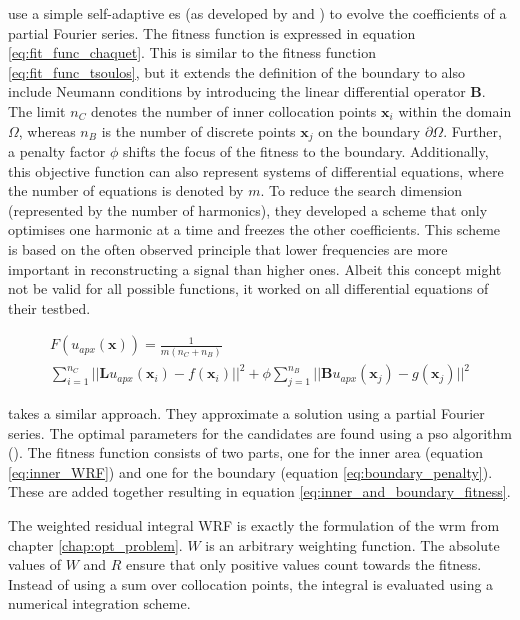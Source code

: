 \documentclass[./\jobname.tex]{subfiles}
\begin{document}
\cite{chaquet_solving_2012} use a simple self-adaptive \gls{es} (as developed by \cite{schwefel_evolutionsstrategien_1977} and \cite{rechenberg_evolutionsstrategien_1978}) to evolve the coefficients of a partial Fourier series. The fitness function is expressed in equation \eqref{eq:fit_func_chaquet}. This is similar to the fitness function \ref{eq:fit_func_tsoulos}, but it extends the definition of the boundary to also include Neumann conditions by introducing the linear differential operator $\mathbf{B}$. The limit $n_C$ denotes the number of inner collocation points $\mathbf{x}_i$ within the domain $\Omega$, whereas $n_B$ is the number of discrete points $\mathbf{x}_j$ on the boundary $\partial \Omega$. Further, a penalty factor $\phi$ shifts the focus of the fitness to the boundary. Additionally, this objective function can also represent systems of differential equations, where the number of equations is denoted by $m$. To reduce the search dimension (represented by the number of harmonics), they developed a scheme that only optimises one harmonic at a time and freezes the other coefficients. This scheme is based on the often observed principle that lower frequencies are more important in reconstructing a signal than higher ones. Albeit this concept might not be valid for all possible functions, it worked on all differential equations of their testbed. 

\begin{equation}
\label{eq:fit_func_chaquet_2012}
\begin{split}
F(u_{apx}(\mathbf{x})) = 
\frac{1}{m (n_C + n_B)} \\ 
\sum_{i=1}^{n_C} || \mathbf{L}u_{apx}(\mathbf{x}_i) - f(\mathbf{x}_i)||^2 + \phi \sum_{j=1}^{n_B} || \mathbf{B}u_{apx}(\mathbf{x}_j) - g(\mathbf{x}_j)||^2  
\end{split}
\end{equation}

\cite{babaei_general_2013} takes a similar approach. They approximate a solution using a partial Fourier series. The optimal parameters for the candidates are found using a \gls{pso} algorithm (\cite{kennedy_particle_1995}). The fitness function consists of two parts, one for the inner area (equation \eqref{eq:inner_WRF}) and one for the boundary (equation \eqref{eq:boundary_penalty}). These are added together resulting in equation \eqref{eq:inner_and_boundary_fitness}.

The weighted residual integral WRF is exactly the formulation of the \gls{wrm} from chapter \ref{chap:opt_problem}. $W$ is an arbitrary weighting function. The absolute values of $W$ and $R$ ensure that only positive values count towards the fitness. Instead of using a sum over collocation points, the integral is evaluated using a numerical integration scheme.
\end{document}
